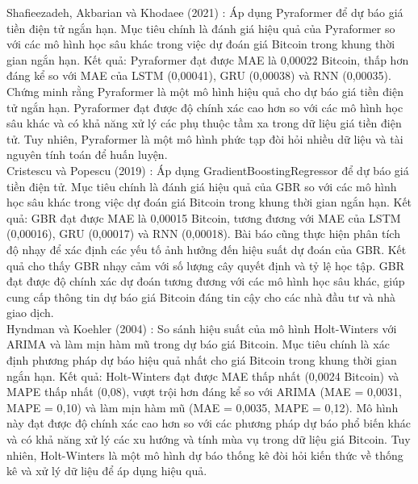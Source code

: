 \documentclass{ieeeojies}
\begin{document}
Shafieezadeh, Akbarian và Khodaee (2021) \cite{b8}: Áp dụng Pyraformer để dự báo giá tiền điện tử ngắn hạn. Mục tiêu chính là đánh giá hiệu quả của Pyraformer so với các mô hình học sâu khác trong việc dự đoán giá Bitcoin trong khung thời gian ngắn hạn. Kết quả: Pyraformer đạt được MAE là 0,00022 Bitcoin, thấp hơn đáng kể so với MAE của LSTM (0,00041), GRU (0,00038) và RNN (0,00035). Chứng minh rằng Pyraformer là một mô hình hiệu quả cho dự báo giá tiền điện tử ngắn hạn. Pyraformer đạt được độ chính xác cao hơn so với các mô hình học sâu khác và có khả năng xử lý các phụ thuộc tầm xa trong dữ liệu giá tiền điện tử. Tuy nhiên, Pyraformer là một mô hình phức tạp đòi hỏi nhiều dữ liệu và tài nguyên tính toán để huấn luyện. \\

Cristescu và Popescu (2019) \cite{b9}: Áp dụng GradientBoostingRegressor để dự báo giá tiền điện tử. Mục tiêu chính là đánh giá hiệu quả của GBR so với các mô hình học sâu khác trong việc dự đoán giá Bitcoin trong khung thời gian ngắn hạn. Kết quả: GBR đạt được MAE là 0,00015 Bitcoin, tương đương với MAE của LSTM (0,00016), GRU (0,00017) và RNN (0,00018). Bài báo cũng thực hiện phân tích độ nhạy để xác định các yếu tố ảnh hưởng đến hiệu suất dự đoán của GBR. Kết quả cho thấy GBR nhạy cảm với số lượng cây quyết định và tỷ lệ học tập. GBR đạt được độ chính xác dự đoán tương đương với các mô hình học sâu khác, giúp cung cấp thông tin dự báo giá Bitcoin đáng tin cậy cho các nhà đầu tư và nhà giao dịch. \\ 

Hyndman và Koehler (2004) \cite{b10}: So sánh hiệu suất của mô hình Holt-Winters với ARIMA và làm mịn hàm mũ trong dự báo giá Bitcoin. Mục tiêu chính là xác định phương pháp dự báo hiệu quả nhất cho giá Bitcoin trong khung thời gian ngắn hạn. Kết quả: Holt-Winters đạt được MAE thấp nhất (0,0024 Bitcoin) và MAPE thấp nhất (0,08), vượt trội hơn đáng kể so với ARIMA (MAE = 0,0031, MAPE = 0,10) và làm mịn hàm mũ (MAE = 0,0035, MAPE = 0,12). Mô hình này đạt được độ chính xác cao hơn so với các phương pháp dự báo phổ biến khác và có khả năng xử lý các xu hướng và tính mùa vụ trong dữ liệu giá Bitcoin. Tuy nhiên, Holt-Winters là một mô hình dự báo thống kê đòi hỏi kiến thức về thống kê và xử lý dữ liệu để áp dụng hiệu quả. \\
\end{document}
